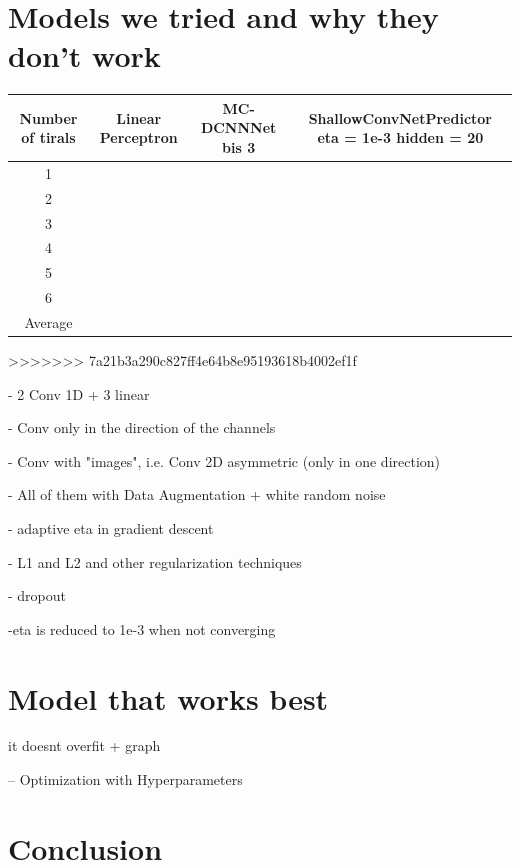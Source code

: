 \documentclass{article}
\begin{document}
 \section{Models we tried and why they don't work}\label{sec_allmodel}

 \begin{center}
    \begin{tabular}{|  c | c | c  | c |}
    \hline
    Number of tirals & Linear Perceptron & MC-DCNNNet bis 3 & ShallowConvNetPredictor eta = 1e-3 hidden = 20 \\ \hline
    1 & & & \\
    2 & & & \\
    3 & & & \\
    4 & & & \\
    5 & & & \\
    6 & & & \\
        \hline
    Average & & & \\
        \hline
    \end{tabular}
\end{center}
>>>>>>> 7a21b3a290c827ff4e64b8e95193618b4002ef1f



 - 2 Conv 1D + 3 linear 
 
 - Conv only in the direction of the channels \cite{zheng2014time}
 
 - Conv with "images", i.e. Conv 2D asymmetric (only in one direction) \cite{schirrmeister2017deep}
 
 - All of them with Data Augmentation + white random noise \cite{wang2018data}
 
 -  adaptive eta in gradient descent 
 
 - L1 and L2 and other regularization techniques  \cite{goodfellow2016deep} 
 
 - dropout 
 
 -eta is reduced to 1e-3 when not converging
 
 
  \section{Model that works best}\label{sec_themodel}
 
 it doesnt overfit + graph
 
 
 -- Optimization with Hyperparameters
  
 \section{Conclusion}\label{sec_conclusion}
 
 

 
  
  
  
\end{document}
